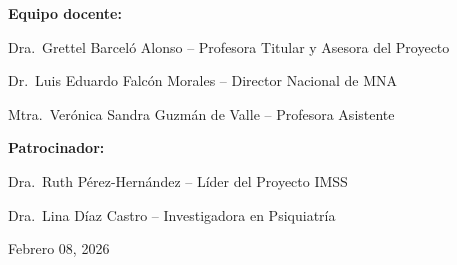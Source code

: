\documentclass[12pt,letterpaper]{article}
\begin{document}
\begin{titlepage}
\begin{center}
\vfill

{\large \textbf{\textcolor{tecblue}{Equipo docente:}}}

\vspace{0.2cm}

Dra.\ Grettel Barceló Alonso -- Profesora Titular y Asesora del Proyecto

Dr.\ Luis Eduardo Falcón Morales -- Director Nacional de MNA

Mtra.\ Verónica Sandra Guzmán de Valle -- Profesora Asistente

\vfill

{\large \textbf{\textcolor{tecblue}{Patrocinador:}}}

\vspace{0.2cm}

Dra.\ Ruth Pérez-Hernández -- Líder del Proyecto IMSS

Dra.\ Lina Díaz Castro -- Investigadora en Psiquiatría

\vfill

Febrero 08, 2026

\end{center}
\end{titlepage}

\tableofcontents
\newpage
\listoffigures
\newpage

\thispagestyle{empty}

\vspace*{1cm}
\end{document}
